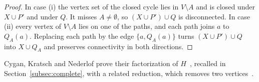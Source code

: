 \begin{proof}
In case (i) the vertex set of the closed cycle lies in $V\setminus A$ and is closed under $X\cup P'$ and under $Q$. It misses $A\neq\emptyset$, so $(X\cup P')\cup Q$ is disconnected. In case (ii) every vertex of $V\setminus A$ lies on one of the paths, and each path joins $a$ to $Q_A(a)$. Replacing each path by the edge $\{a,Q_A(a)\}$ turns $(X\cup P')\cup Q$ into $X\cup Q_A$ and preserves connectivity in both directions.
\end{proof}

Cygan, Kratsch and Nederlof prove their factorization of $H$~\cite[Thm.~3.4]{CKN18}, recalled in Section~\ref{subsec:complete}, with a related reduction, which removes two vertices~\cite[App.~A.1, Def.~A.1 and Lemma~A.3]{CKN18}.
